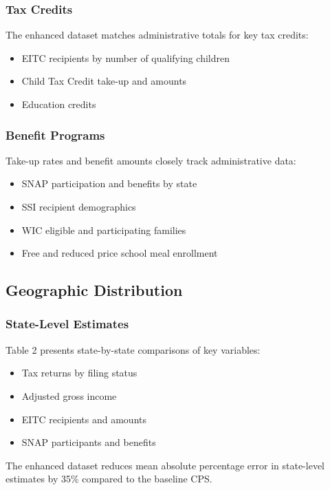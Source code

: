 \subsubsection{Tax Credits}

The enhanced dataset matches administrative totals for key tax credits:
\begin{itemize}
    \item EITC recipients by number of qualifying children
    \item Child Tax Credit take-up and amounts
    \item Education credits
\end{itemize}

\subsubsection{Benefit Programs}

Take-up rates and benefit amounts closely track administrative data:
\begin{itemize}
    \item SNAP participation and benefits by state
    \item SSI recipient demographics
    \item WIC eligible and participating families
    \item Free and reduced price school meal enrollment
\end{itemize}

\subsection{Geographic Distribution}

\subsubsection{State-Level Estimates}

Table 2 presents state-by-state comparisons of key variables:
\begin{itemize}
    \item Tax returns by filing status
    \item Adjusted gross income
    \item EITC recipients and amounts
    \item SNAP participants and benefits
\end{itemize}

The enhanced dataset reduces mean absolute percentage error in state-level estimates by 35\% compared to the baseline CPS.

